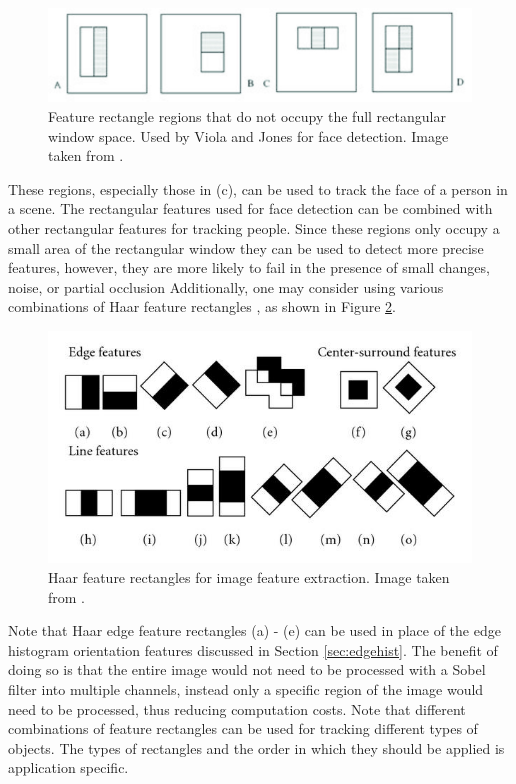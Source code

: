 \documentclass[11pt]{article}
\begin{document}
\begin{figure}[H]
\centering
\includegraphics[scale=.4]{img/partialregions.jpg}
\caption{Feature rectangle regions that do not occupy the full rectangular window space. Used by Viola and Jones for face detection. Image taken from \cite{facedetection}.}
\label{fig:partialregions}
\end{figure}

These regions, especially those in (c), can be used to track the face of a person in a scene. The rectangular features used for face detection can be combined with other rectangular features for tracking people. Since these regions only occupy a small area of the rectangular window they can be used to detect more precise features, however, they are more likely to fail in the presence of small changes, noise, or partial occlusion Additionally, one may consider using various combinations of Haar feature rectangles \cite{haar} \cite{haar2}, as shown in Figure \ref{fig:haarrectangles}.

\begin{figure}[H]
\centering
\includegraphics[scale=1.9]{img/haarrectangles.jpg}
\caption{Haar feature rectangles for image feature extraction. Image taken from \cite{haarpic}.}
\label{fig:haarrectangles}
\end{figure}

Note that Haar edge feature rectangles (a) - (e) can be used in place of the edge histogram orientation features discussed in Section \ref{sec:edgehist}. The benefit of doing so is that the entire image would not need to be processed with a Sobel filter into multiple channels, instead only a specific region of the image would need to be processed, thus reducing computation costs. Note that different combinations of feature rectangles can be used for tracking different types of objects. The types of rectangles and the order in which they should be applied is application specific.   
\end{document}
